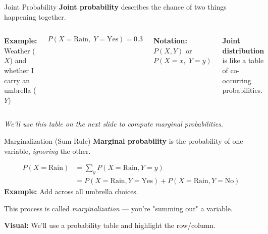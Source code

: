 \documentclass[handout,aspectratio=169]{beamer}
\begin{document}
\begin{frame}{Joint Probability}
	\textbf{Joint probability} describes the chance of two things happening together.
	
	\vspace{1em}
	\begin{columns}
		\textbf{Example:} Weather ($X$) and whether I carry an umbrella ($Y$)
		  
		\vspace{0.5em}
		\[
			P(X = \text{Rain},\; Y = \text{Yes}) = 0.3
		\]
		  
		\vspace{0.5em}
		\textbf{Notation:} $P(X, Y)$ or $P(X = x,\; Y = y)$
		
		\vspace{1em}
		\textbf{Joint distribution} is like a table of co-occurring probabilities.
		  
		\vspace{0.5em}
		  
		\includegraphics[width=\linewidth]{chapter_figs/01_figs/joint_probability_diagram.png}
	\end{columns}
	  
	\textit{We'll use this table on the next slide to compute marginal probabilities.}
\end{frame}

\begin{frame}{Marginalization (Sum Rule)}
	\textbf{Marginal probability} is the probability of one variable, \textit{ignoring} the other.
	
	\vspace{1em}
	\begin{align*}
		P(X = \text{Rain}) & = \sum_y P(X = \text{Rain}, Y = y)                               \\
		                   & = P(X=\text{Rain}, Y=\text{Yes}) + P(X=\text{Rain}, Y=\text{No}) 
	\end{align*}
	\vspace{0.5em}
	\textbf{Example:} Add across all umbrella choices.
	
	\vspace{0.5em}
	This process is called \textit{marginalization} — you're "summing out" a variable.
	
	\vspace{1em}
	\textbf{Visual:} We'll use a probability table and highlight the row/column.
\end{frame}
\end{document}
